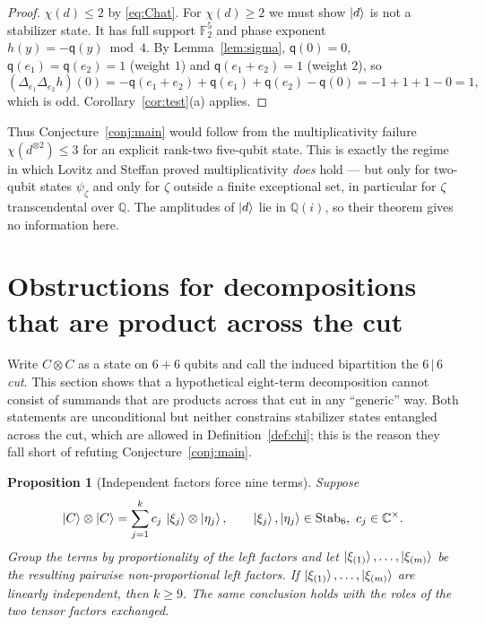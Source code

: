 \documentclass[11pt]{article}
\theoremstyle{plain}
\newtheorem{proposition}[theorem]{Proposition}
\theoremstyle{definition}
\newcommand{\F}{\mathbb{F}}
\newcommand{\C}{\mathbb{C}}
\newcommand{\Q}{\mathbb{Q}}
\newcommand{\Stab}{\mathrm{Stab}}
\newcommand{\qq}{\mathsf{q}}
\begin{document}
\begin{proof}
$\chi(d)\le2$ by \eqref{eq:Chat}. For $\chi(d)\ge2$ we must show $\ket d$ is not a
stabilizer state. It has full support $\F_2^5$ and phase exponent $h(y)=-\qq(y)\bmod 4$.
By Lemma~\ref{lem:sigma}, $\qq(0)=0$, $\qq(e_1)=\qq(e_2)=1$ (weight $1$) and
$\qq(e_1+e_2)=1$ (weight $2$), so
\[
(\Delta_{e_1}\Delta_{e_2}h)(0)=-\qq(e_1+e_2)+\qq(e_1)+\qq(e_2)-\qq(0)=-1+1+1-0=1,
\]
which is odd. Corollary~\ref{cor:test}(a) applies.
\end{proof}

Thus Conjecture~\ref{conj:main} would follow from the multiplicativity failure
$\chi(d^{\otimes2})\le3$ for an explicit rank-two five-qubit state. This is exactly the
regime in which Lovitz and Steffan \cite[Thm.~4.1]{LovitzSteffan2022} proved
multiplicativity \emph{does} hold --- but only for two-qubit states $\psi_\zeta$ and
only for $\zeta$ outside a finite exceptional set, in particular for $\zeta$
transcendental over $\Q$. The amplitudes of $\ket d$ lie in $\Q(i)$, so their theorem
gives no information here.

\section{Obstructions for decompositions that are product across the cut}\label{sec:cut}

Write $C\otimes C$ as a state on $6+6$ qubits and call the induced bipartition the
\emph{$6\,|\,6$ cut}. This section shows that a hypothetical eight-term decomposition
cannot consist of summands that are products across that cut in any ``generic'' way.
Both statements are unconditional but neither constrains stabilizer states entangled
across the cut, which are allowed in Definition~\ref{def:chi}; this is the reason they
fall short of refuting Conjecture~\ref{conj:main}.

\begin{proposition}[Independent factors force nine terms]\label{prop:indep}
Suppose
\begin{equation}\label{eq:prodcut}
\ket C\otimes\ket C=\sum_{j=1}^kc_j\,\ket{\xi_j}\otimes\ket{\eta_j},
\qquad \ket{\xi_j},\ket{\eta_j}\in\Stab_6,\ c_j\in\C^\times .
\end{equation}
Group the terms by proportionality of the left factors and let
$\ket{\xi_{(1)}},\dots,\ket{\xi_{(m)}}$ be the resulting pairwise
non-proportional left factors. If $\ket{\xi_{(1)}},\dots,\ket{\xi_{(m)}}$ are
linearly independent, then $k\ge9$. The same conclusion holds with the roles of the two
tensor factors exchanged.
\end{proposition}
\end{document}
